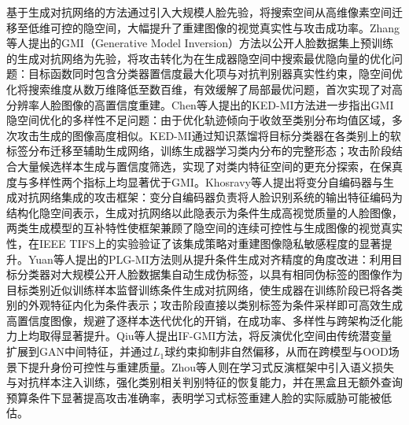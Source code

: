 基于生成对抗网络的方法通过引入大规模人脸先验，将搜索空间从高维像素空间迁移至低维可控的隐空间，大幅提升了重建图像的视觉真实性与攻击成功率。Zhang等人\cite{zhang2020secret}提出的GMI（Generative Model Inversion）方法以公开人脸数据集上预训练的生成对抗网络为先验，将攻击转化为在生成器隐空间中搜索最优隐向量的优化问题：目标函数同时包含分类器置信度最大化项与对抗判别器真实性约束，隐空间优化将搜索维度从数万维降低至数百维，有效缓解了局部最优问题，首次实现了对高分辨率人脸图像的高置信度重建。Chen等人\cite{chen2021knowledge}提出的KED-MI方法进一步指出GMI隐空间优化的多样性不足问题：由于优化轨迹倾向于收敛至类别分布均值区域，多次攻击生成的图像高度相似。KED-MI通过知识蒸馏将目标分类器在各类别上的软标签分布迁移至辅助生成网络，训练生成器学习类内分布的完整形态；攻击阶段结合大量候选样本生成与置信度筛选，实现了对类内特征空间的更充分探索，在保真度与多样性两个指标上均显著优于GMI。Khosravy等人\cite{khosravy2022model}提出将变分自编码器与生成对抗网络集成的攻击框架：变分自编码器负责将人脸识别系统的输出特征编码为结构化隐空间表示，生成对抗网络以此隐表示为条件生成高视觉质量的人脸图像，两类生成模型的互补特性使框架兼顾了隐空间的连续可控性与生成图像的视觉真实性，在IEEE TIFS上的实验验证了该集成策略对重建图像隐私敏感程度的显著提升。Yuan等人\cite{yuan2023pseudo}提出的PLG-MI方法则从提升条件生成对齐精度的角度改进：利用目标分类器对大规模公开人脸数据集自动生成伪标签，以具有相同伪标签的图像作为目标类别近似训练样本监督训练条件生成对抗网络，使生成器在训练阶段已将各类别的外观特征内化为条件表示；攻击阶段直接以类别标签为条件采样即可高效生成高置信度图像，规避了逐样本迭代优化的开销，在成功率、多样性与跨架构泛化能力上均取得显著提升。Qiu等人\cite{qiu2024closer}提出IF-GMI方法，将反演优化空间由传统潜变量扩展到GAN中间特征，并通过$L_1$球约束抑制非自然偏移，从而在跨模型与OOD场景下提升身份可控性与重建质量。Zhou等人\cite{zhou2023boosting}则在学习式反演框架中引入语义损失与对抗样本注入训练，强化类别相关判别特征的恢复能力，并在黑盒且无额外查询预算条件下显著提高攻击准确率，表明学习式标签重建人脸的实际威胁可能被低估。

